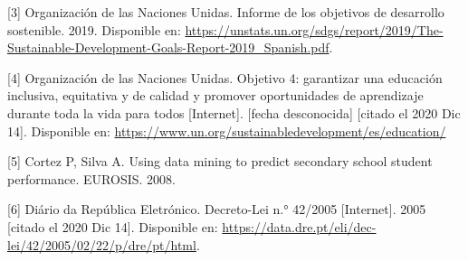 \documentclass[
]{article}
\begin{document}
{[}3{]} Organización de las Naciones Unidas. Informe de los objetivos de
desarrollo sostenible. 2019. Disponible en:
\url{https://unstats.un.org/sdgs/report/2019/The-Sustainable-Development-Goals-Report-2019_Spanish.pdf}.

{[}4{]} Organización de las Naciones Unidas. Objetivo 4: garantizar una
educación inclusiva, equitativa y de calidad y promover oportunidades de
aprendizaje durante toda la vida para todos {[}Internet{]}. {[}fecha
desconocida{]} {[}citado el 2020 Dic 14{]}. Disponible en:
\url{https://www.un.org/sustainabledevelopment/es/education/}

{[}5{]} Cortez P, Silva A. Using data mining to predict secondary school
student performance. EUROSIS. 2008.

{[}6{]} Diário da República Eletrónico. Decreto-Lei n.° 42/2005
{[}Internet{]}. 2005 {[}citado el 2020 Dic 14{]}. Disponible en:
\url{https://data.dre.pt/eli/dec-lei/42/2005/02/22/p/dre/pt/html}.
\end{document}
